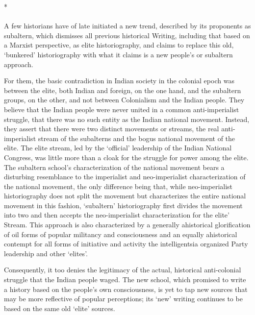 \begin{center}*\end{center}

\paragraph*{}
A few historians have of late initiated a new trend, described by its proponents as subaltern, which dismisses all previous historical Writing, including that based on a Marxist perspective, as elite historiography, and claims to replace this old, `bunkered' historiography with what it claims is a new people's or subaltern approach.

For them, the basic contradiction in Indian society in the colonial epoch was between the elite, both Indian and foreign, on the one hand, and the subaltern groups, on the other, and not between Colonialism and the Indian people. They believe that the Indian people were never united in a common anti-imperialist struggle, that there was no such entity as the Indian national movement. Instead, they assert that there were two distinct movements or streams, the real anti-imperialist stream of the subalterns and the bogus national movement of the elite. The elite stream, led by the `official' leadership of the Indian National Congress, was little more than a cloak for the struggle for power among the elite. The subaltern school's characterization of the national movement bears a disturbing resemblance to the imperialist and neo-imperialist characterization of the national movement, the only difference being that, while neo-imperialist historiography does not split the movement but characterizes the entire national movement in this fashion, `subaltern' historiography first divides the movement into two and then accepts the neo-imperialist characterization for the elite' Stream. This approach is also characterized by a generally ahistorical glorification of oil forms of popular militancy and consciousness and an equally ahistorical contempt for all forms of initiative and activity the intelligentsia organized Party leadership and other `elites'.

Consequently, it too denies the legitimacy of the actual, historical anti-colonial struggle that the Indian people waged. The new school, which promised to write a history based on the people's own consciousness, is yet to tap new sources that may be more reflective of popular perceptions; its `new' writing continues to be based on the same old `elite' sources.

